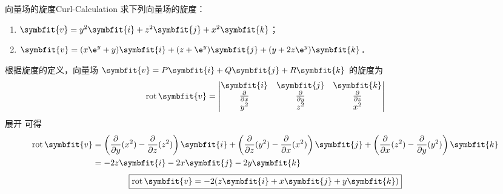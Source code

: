 \begin{problem}{向量场的旋度}{Curl-Calculation}
    求下列向量场的旋度：
    \begin{enumerate}
        \item $\symbfit{v} = y^2 \symbfit{i} + z^2 \symbfit{j} + x^2 \symbfit{k}$；
        \item $\symbfit{v} = (x \e^y + y)\symbfit{i} + (z + \e^y)\symbfit{j} + (y + 2z \e^y)\symbfit{k}$．
    \end{enumerate}
\end{problem}

\begin{solution}

    根据旋度的定义，向量场 $\symbfit{v} = P \symbfit{i} + Q \symbfit{j} + R \symbfit{k}$ 的旋度为
    \begin{equation} \label{eq:curl-def-1}
        \operatorname{rot} \symbfit{v} = \begin{vmatrix} \symbfit{i} & \symbfit{j} & \symbfit{k} \\ \frac{\partial}{\partial x} & \frac{\partial}{\partial y} & \frac{\partial}{\partial z} \\ y^2 & z^2 & x^2 \end{vmatrix}
    \end{equation}
    展开  可得
    \begin{equation} \label{eq:curl-res-1}
        \begin{aligned}
            \operatorname{rot} \symbfit{v} & = \left( \frac{\partial}{\partial y} (x^2) - \frac{\partial}{\partial z} (z^2) \right) \symbfit{i} + \left( \frac{\partial}{\partial z} (y^2) - \frac{\partial}{\partial x} (x^2) \right) \symbfit{j} + \left( \frac{\partial}{\partial x} (z^2) - \frac{\partial}{\partial y} (y^2) \right) \symbfit{k} \\
                                           & = -2z \symbfit{i} - 2x \symbfit{j} - 2y \symbfit{k}
        \end{aligned}
    \end{equation}
    \begin{equation}
        \boxed{\operatorname{rot} \symbfit{v} = -2(z \symbfit{i} + x \symbfit{j} + y \symbfit{k})}
    \end{equation}



\end{solution}
